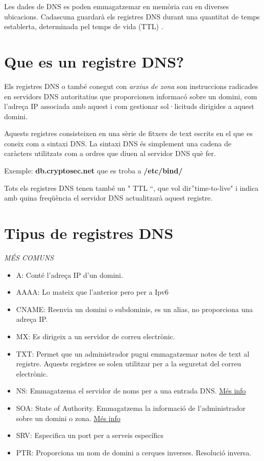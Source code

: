 \documentclass[]{article}
\begin{document}
Les dades de DNS es poden emmagatzemar en memòria cau en diverses
ubicacions. Cadascuna guardarà els registres DNS durant una quantitat de
temps establerta, determinada pel temps de vida (TTL) .

\hypertarget{que-es-un-registre-dns}{%
\section{\texorpdfstring{\textbf{Que es un registre
DNS?}}{Que es un registre DNS?}}\label{que-es-un-registre-dns}}

Els registres DNS o també conegut con \emph{arxius de zona} son
instruccions radicades en servidors DNS autoritatius que proporcionen
informacó sobre un domini, com l'adreça IP associada amb aquest i com
gestionar sol·licituds dirigides a aquest domini.

Aquests registres consisteixen en una sèrie de fitxers de text escrits
en el que es coneix com a sintaxi DNS. La sintaxi DNS és simplement una
cadena de caràcters utilitzats com a ordres que diuen al servidor DNS
què fer.

Exemple: \textbf{db.cryptosec.net} que es troba a \textbf{/etc/bind/}

Tots els registres DNS tenen també un " TTL ``, que vol
dir''time-to-live" i indica amb quina freqüència el servidor DNS
actualitzarà aquest registre.

\hypertarget{tipus-de-registres-dns}{%
\section{\texorpdfstring{\textbf{Tipus de registres
DNS}}{Tipus de registres DNS}}\label{tipus-de-registres-dns}}

\emph{MÉS COMUNS}

\begin{itemize}
\item
  A: Conté l'adreça IP d'un domini.
\item
  AAAA: Lo mateix que l'anterior pero per a Ipv6
\item
  CNAME: Reenvia un domini o subdominis, es un alias, no proporciona una
  adreça IP.
\item
  MX: Es dirigeix a un servidor de correu electrònic.
\item
  TXT: Permet que un administrador pugui emmagatzemar notes de text al
  registre. Aquests registres se solen utilitzar per a la seguretat del
  correu electrònic.
\item
  NS: Emmagatzema el servidor de noms per a una entrada DNS.
  \href{https://www.cloudflare.com/es-es/learning/dns/dns-records/dns-soa-record/}{Més
  info}
\item
  SOA: State of Authority. Emmagatzema la informació de l'administrador
  sobre un domini o zona.
  \href{https://www.cloudflare.com/es-es/learning/dns/dns-records/dns-ns-record/}{Més
  info}
\item
  SRV: Especifica un port per a serveis específics
\item
  PTR: Proporciona un nom de domini a cerques inverses. Resolució
  inversa.
\end{itemize}
\end{document}
